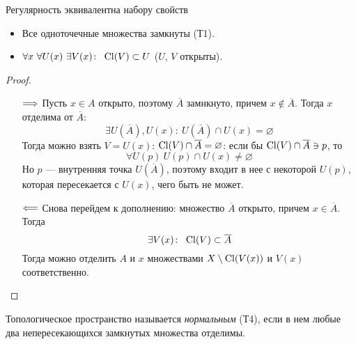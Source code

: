 \begin{remark}
	Регулярность эквивалентна набору свойств
	\begin{itemize}
		\item Все одноточечные множества замкнуты (Т1).
		\item $\forall x~ \forall U(x)~ \exists V(x)\colon~ \operatorname{Cl}(V) \subset U$
			($U$, $V$ открыты).
	\end{itemize}
\end{remark}
\begin{proof}
	\enewline
	\begin{itemize}
		\item[$\Longrightarrow$] Пусть $x \in A$ открыто, поэтому $\overline{A}$ замнкнуто, причем
			$x \notin \overline{A}$. Тогда $x$ отделима от $\overline{A}$:
\[
	\exists U(\overline{A}), U(x)\colon~ U(\overline{A}) \cap U(x) = \varnothing
\]
	Тогда можно взять $V = U(x)$: $\operatorname{Cl}(V) \cap \overline{A} = \varnothing$: если 
	бы $\operatorname{Cl}(V) \cap \overline{A} \ni p$, то 
\[
	\forall U(p)~ U(p) \cap U(x) \neq \varnothing
\]
	Но $p$ --- внутренняя точка $U(\overline{A})$, поэтому входит в нее с
	некоторой $U(p)$, которая пересекается с $U(x)$, чего быть не может.
		\item[$\Longleftarrow$] Снова перейдем к дополнению: множество $\overline{A}$
			открыто, причем $x \in \overline{A}$. Тогда
\[
	\exists V(x)\colon~ \operatorname{Cl}(V) \subset \overline{A}
\]
	Тогда можно отделить $A$ и $x$ множествами $X \setminus \operatorname{Cl}(V(x))$ 
	и $V(x)$ соответственно.
	\end{itemize}
\end{proof}

\begin{definition}
	Топологическое пространство называется \textit{нормальным} (Т4), если
	в нем любые два непересекающихся замкнутых множества отделимы.
\end{definition}

